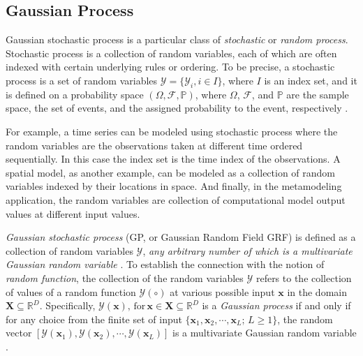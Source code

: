 \subsection{Gaussian Process}\label{sub:gp_gp}

Gaussian stochastic process is a particular class of \emph{stochastic} or \emph{random process}.
Stochastic process is a collection of random variables, each of which are often indexed with certain underlying rules or ordering.
To be precise, a stochastic process is a set of random variables $\bm{\mathcal{Y}} = \{\mathcal{Y}_i, i \in I\}$, where $I$ is an index set, 
and it is defined on a probability space $(\Omega, \mathcal{F}, \mathbb{P})$, 
where $\Omega$, $\mathcal{F}$, and $\mathbb{P}$ are the sample space, the set of events, and the assigned probability to the event, respectively \cite{Syski2014}.

For example, a time series can be modeled using stochastic process where the random variables are the observations taken at different time ordered sequentially.
In this case the index set is the time index of the observations.
A spatial model, as another example, can be modeled as a collection of random variables indexed by their locations in space.
And finally, in the metamodeling application, the random variables are collection of computational model output values at different input values.

\emph{Gaussian stochastic process} (GP, or Gaussian Random Field GRF) is defined as a collection of random variables $\bm{\mathcal{Y}}$, 
\emph{any arbitrary number of which is a multivariate Gaussian random variable} \cite{Rasmussen2006, Debicki2014}.
To establish the connection with the notion of \emph{random function}, the collection of the random variables $\bm{\mathcal{Y}}$ refers to the collection of values of a random function $\mathcal{Y}(\circ)$ at various possible input $\bm{x}$ in the domain $\mathbf{X} \subseteq \mathbb{R}^D$.
Specifically, $\mathcal{Y}(\bm{x}), \, \text{for} \, \bm{x} \in \mathbf{X} \subseteq \mathbb{R}^D$ is a \emph{Gaussian process} if and only if for any choice from the finite set of input $\{\bm{x}_1, \bm{x}_2, \cdots, \bm{x}_L ; \, L \geq 1\}$, the random vector $\left[\mathcal{Y}(\mathbf{x}_1), \mathcal{Y}(\mathbf{x}_2), \cdots, \mathcal{Y}(\mathbf{x}_L)\right]$ is a multivariate Gaussian random variable \cite{Santner2003}.

